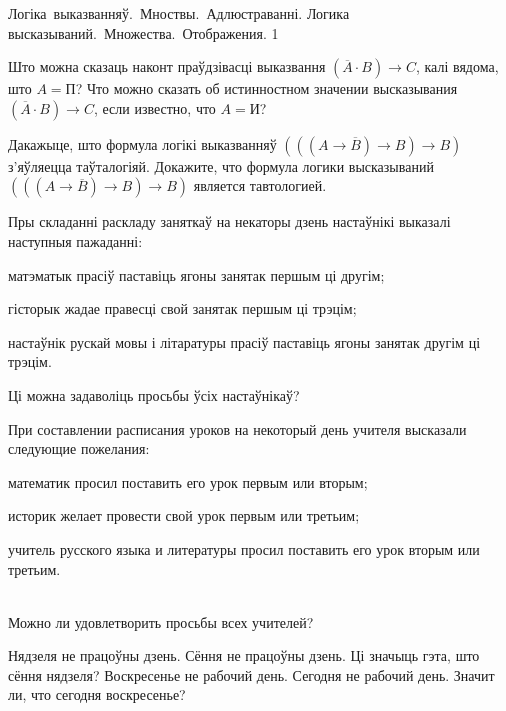 



\quizTitle
{Логіка~выказванняў.~Мноствы.~Адлюстраванні.}
{Логика высказываний.~Множества.~Отображения.}
{1}

\begin{problemList}
	
\problemItemSimple
{Што можна сказаць наконт праўдзівасці выказвання $(\overline{A} \cdot B) \to C$, калі вядома, што $A = \mbox{П}$?}
{Что можно сказать об истинностном значении высказывания $(\overline{A} \cdot B) \to C$, если известно, что $A = \mbox{И}$?}

\bigskip

\problemItemSimple
{Дакажыце, што формула логікі выказванняў $(((A \to \overline{B}) \to B) \to B)$ з'яўляецца таўталогіяй.}
{Докажите, что формула логики высказываний $(((A \to \overline{B}) \to B) \to B)$ является тавтологией.}

\bigskip

\problemItemSimple
{Пры складанні раскладу заняткаў на некаторы дзень настаўнікі выказалі наступныя пажаданні:
\begin{belarusianEnumerate}
	\item матэматык прасіў паставіць ягоны занятак першым ці другім;
	\item гісторык жадае правесці свой занятак першым ці трэцім;
	\item настаўнік рускай мовы і літаратуры прасіў паставіць ягоны занятак другім ці трэцім.
\end{belarusianEnumerate}

\vspace{-8pt}
Ці можна задаволіць просьбы ўсіх настаўнікаў?}
{При составлении расписания уроков на некоторый день учителя высказали следующие пожелания:
\begin{russianEnumerate}
	\item математик просил поставить его урок первым или вторым;
	\item историк желает провести свой урок первым или третьим;
	\item учитель русского языка и литературы просил поставить его урок вторым или третьим.
\end{russianEnumerate}\\
Можно ли удовлетворить просьбы всех учителей?}

\bigskip

\problemItemSimple
{Нядзеля не працоўны дзень. Сёння не працоўны дзень. Ці значыць гэта, што сёння нядзеля?}
{Воскресенье не рабочий день. Сегодня не рабочий день. Значит ли, что сегодня воскресенье?}


\end{problemList}
